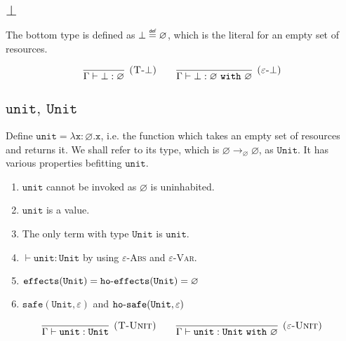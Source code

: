 \documentclass{llncs}
\newcommand{\keywadj}[1]{\mathtt{#1}}
\newcommand{\keyw}[1]{\keywadj{#1}~}
\newcommand{\kw}[1]{\keyw{ #1 }}
\newcommand{\kwa}[1]{\keywadj{ #1 }}
\newcommand{\hyphen}{\hbox{-}}
\newcommand{\unit}[0]{ \kwa{unit} }
\newcommand{\Unit}[0]{ \kwa{Unit} }
\newcommand\defn{\mathrel{\overset{\makebox[0pt]{\mbox{\normalfont\tiny\sffamily def}}}{=}}}
\begin{document}
\subsection{$\bot$}
The bottom type is defined as $\kwa{\bot \defn \varnothing}$, which is the literal for an empty set of resources.

\[
\begin{array}{c}


\infer[\textsc{(T-$\bot$)}]
	{\Gamma \vdash \bot : \varnothing}
	{}
~~~~~~
\infer[\textsc{($\varepsilon$-$\bot$)}]
	{\Gamma \vdash \bot : \varnothing~\kw{with} \varnothing}
	{}

\end{array}
\]

\subsection{$\unit,~\Unit$}

\noindent
Define $\kwa{unit = \lambda x: \varnothing.x}$, i.e. the function which takes an empty set of resources and returns it. We shall refer to its type, which is $\kwa{\varnothing \rightarrow_{\varnothing} \varnothing}$, as $\Unit$. It has various properties befitting $\unit$.

\begin{enumerate}
	\item $\unit$ cannot be invoked as $\varnothing$ is uninhabited.
	\item $\unit$ is a value.
	\item The only term with type $\Unit$ is $\unit$.
	\item $\vdash \unit : \Unit$ by using \textsc{$\varepsilon$-Abs} and \textsc{$\varepsilon$-Var}.
	\item $\kwa{effects}(\Unit) = \kwa{ho \hyphen effects}(\Unit) = \varnothing$
	\item $\kwa{safe}(\Unit, \varepsilon)$ and $\kwa{ho \hyphen safe}(\Unit, \varepsilon)$
\end{enumerate}

\[
\begin{array}{c}


\infer[\textsc{(T-Unit)}]
	{\Gamma \vdash \unit: \Unit}
	{}
~~~~~~
\infer[\textsc{($\varepsilon$-Unit)}]
	{\Gamma \vdash \unit: \Unit~\kw{with} \varnothing}
	{}

\end{array}
\]
\end{document}
